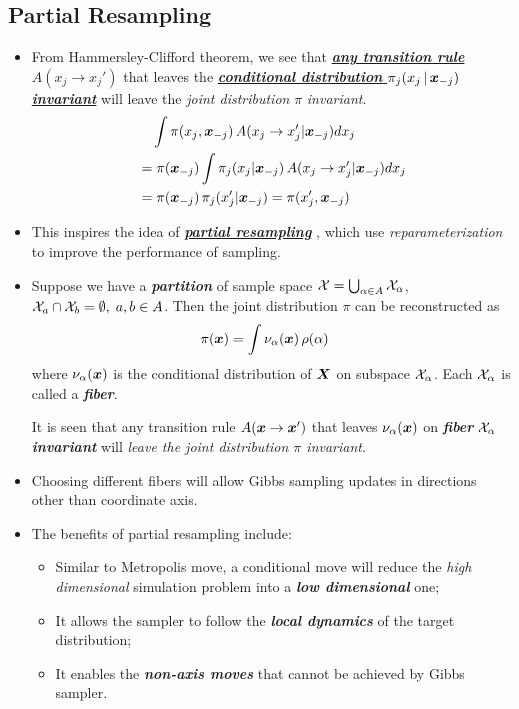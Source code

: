 \documentclass[11pt]{article}
\begin{document}
\subsection{Partial Resampling}
\begin{itemize}
\item From Hammersley-Clifford theorem, we see that \underline{\emph{\textbf{any transition rule}}} $A(x_{j} \rightarrow x_{j}')$ that leaves the \underline{\emph{\textbf{conditional distribution}} $\pi_{j}(x_j \,|\,\boldsymbol{x}_{-j})$ \emph{\textbf{invariant}}} will leave the \emph{joint distribution} $\pi$ \emph{invariant}.
\begin{align*}
&\quad \int \pi(x_j, \boldsymbol{x}_{-j})\,A(x_{j} \rightarrow x_{j}' | \boldsymbol{x}_{-j}) d x_{j} \\
&= \pi(\boldsymbol{x}_{-j})\int \pi_{j}(x_j| \boldsymbol{x}_{-j})\,A(x_{j} \rightarrow x_{j}' | \boldsymbol{x}_{-j}) d x_{j}\\
&= \pi(\boldsymbol{x}_{-j})\,\pi_{j}(x_j'| \boldsymbol{x}_{-j}) = \pi(x_j', \boldsymbol{x}_{-j})
\end{align*}

\item This inspires the idea of \underline{\emph{\textbf{partial resampling}}} \citep{liu2001monte}, which use \emph{reparameterization} to improve the performance of sampling.

\item Suppose we have a \emph{\textbf{partition}} of sample space ${\mathcal X} = \bigcup_{\alpha \in A}{\mathcal X}_{\alpha}$, ${\mathcal X}_{a}\cap {\mathcal X}_{b} = \emptyset, \; a,b\in A$. Then the joint distribution $\pi$ can be reconstructed as \citep{liu2001monte}
\begin{align*}
\pi(\boldsymbol{x}) &= \int \nu_{\alpha}(\boldsymbol{x})\,\rho(\alpha)
\end{align*} where $\nu_{\alpha}(\boldsymbol{x})$ is the conditional distribution of $\boldsymbol{X}$ on subspace ${\mathcal X}_{\alpha}$. Each  ${\mathcal X}_{\alpha}$ is called a \emph{\textbf{fiber}}.

It is seen that any transition rule $A(\boldsymbol{x} \rightarrow \boldsymbol{x}')$ that leaves $\nu_{\alpha}(\boldsymbol{x})$ on \emph{\textbf{fiber}} ${\mathcal X}_{\alpha}$ \emph{\textbf{invariant}} will \emph{leave the joint distribution $\pi$ invariant}.

\item Choosing different fibers will allow Gibbs sampling updates in directions other than coordinate axis.

\item The benefits of partial resampling include:
\begin{itemize}
\item Similar to Metropolis move, a conditional move will reduce the \emph{high dimensional} simulation problem into a \emph{\textbf{low dimensional}} one;
\item It allows the sampler to follow the \emph{\textbf{local dynamics}} of the target distribution;
\item It enables the \emph{\textbf{non-axis moves}} that cannot be achieved by Gibbs sampler.
\end{itemize}
 
\end{itemize}
\end{document}
